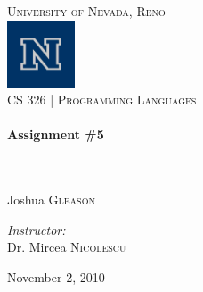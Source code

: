\begin{titlepage}
\begin{center}

\textsc{\LARGE University of Nevada, Reno}\\[.5cm]
\includegraphics[width=0.15\textwidth]{./logo.png}\\[.5cm]

\textsc{\large CS 326 | Programming Languages } \\[.5cm]

\HRule \\[0.4cm]
{ \huge \bfseries Assignment \#5}\\[0.4cm]

\HRule \\[1.5cm]

\begin{minipage}{0.4\textwidth}
  \begin{flushleft} \large
    \emph{}\\
    Joshua \textsc{Gleason}\\
  \end{flushleft}
\end{minipage}
\begin{minipage}{0.4\textwidth}
  \begin{flushright} \large
    \emph{Instructor:} \\
    Dr. Mircea \textsc{Nicolescu}
  \end{flushright}
\end{minipage}

\vspace*{\fill}



\vspace*{\fill}

{\large November 2, 2010}

\end{center}

\end{titlepage}

